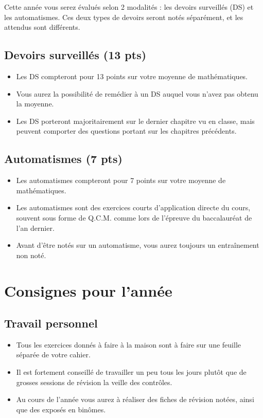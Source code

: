 \documentclass[oneside,12pt]{article}          %
\begin{document}
Cette année vous serez évalués selon 2 modalités : les devoirs surveillés (DS) et les automatismes. Ces deux types de devoirs seront notés séparément, et les attendus sont différents.

\subsection*{Devoirs surveillés (13 pts) }
\begin{itemize}[label=$\bullet$]
	\item Les DS compteront pour 13 points sur votre moyenne de mathématiques.
	\item Vous aurez la possibilité de remédier à un DS auquel vous n'avez pas obtenu la moyenne.
	\item Les DS porteront majoritairement sur le dernier chapitre vu en classe, mais peuvent comporter des questions portant sur les chapitres précédents.
\end{itemize}

\subsection*{Automatismes (7 pts) }
\begin{itemize}[label=$\bullet$]
	\item Les automatismes compteront pour 7 points sur votre moyenne de mathématiques.
	\item Les automatismes sont des exercices courts d'application directe du cours, souvent sous forme de Q.C.M. comme lors de l'épreuve du baccalauréat de l'an dernier.
	\item Avant d'être notés sur un automatisme, vous aurez toujours un entraînement non noté.
\end{itemize}



\section{Consignes pour l'année}

\subsection*{Travail personnel}
\begin{itemize}[label=$\bullet$]
	\item Tous les exercices donnés à faire à la maison sont à faire sur une feuille séparée de votre cahier.
	\item Il est fortement conseillé de travailler un peu tous les jours plutôt que de grosses sessions de révision la veille des contrôles.
	\item Au cours de l'année vous aurez à réaliser des fiches de révision notées, ainsi que des exposés en binômes.
\end{itemize}
\end{document}
